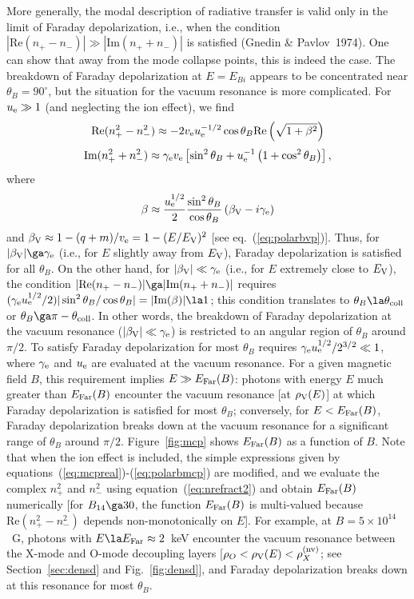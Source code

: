 \documentclass{mn2e}
\newcommand{\be}{\begin{equation}}
\newcommand{\ee}{\end{equation}}
\newcommand{\lp}{\left(}
\newcommand{\rp}{\right)}
\newcommand{\lb}{\left[}
\newcommand{\rb}{\right]}
\newcommand{\Ebi}{E_{Bi}}
\newcommand{\thetab}{\theta_B}
\newcommand{\polarb}{\beta}
\newcommand{\uel}{u_{\rm e}}
\newcommand{\vel}{v_{\rm e}}
\newcommand{\vpq}{q}
\newcommand{\vpm}{m}
\newcommand{\Evp}{E_{\rm V}}
\newcommand{\densvp}{\rho_{\rm V}}
\newcommand{\polarbvp}{\beta_{\rm V}}
\newcommand{\gamdampe}{\gamma_{\rm e}}
\newcommand{\Emcp}{E_{\rm Far}}
\newcommand{\thetamcp}{\theta_{\rm coll}}
\begin{document}
{More generally, the modal description of radiative transfer is
valid only in the limit of Faraday depolarization, i.e., when
the condition $|\mbox{Re}(n_+-n_-)|\gg|\mbox{Im}(n_++n_-)|$
is satisfied (Gnedin \& Pavlov~1974).  One can show that away from
the mode collapse points, this is indeed the case.  The breakdown
of Faraday depolarization at $E=\Ebi$ appears to be concentrated
near $\thetab=90^\circ$, but the situation for the vacuum resonance
is more complicated.  For $\uel\gg 1$ (and neglecting the ion effect),
we find
\be
\mbox{Re}(n_+^2-n_-^2) \approx -2\vel\uel^{-1/2}\cos\thetab
 \mbox{Re}\lp\sqrt{1+\polarb^2}\rp \label{eq:mcpreal}
\ee
\be
\mbox{Im}(n_+^2+n_-^2) \approx \gamdampe\vel\lb\sin^2\thetab
 + \uel^{-1}\lp 1+\cos^2\thetab\rp\rb, \label{eq:mcpimag}
\ee
where
\be
\polarb \approx \frac{\uel^{1/2}}{2}\frac{\sin^2\thetab}{\cos\thetab}
 \lp\polarbvp-i\gamdampe\rp \label{eq:polarbmcp}
\ee
and $\polarbvp\approx 1-(\vpq+\vpm)/\vel=1-(E/\Evp)^2$
[see eq.~(\ref{eq:polarbvp})].  Thus, for $|\polarbvp|\ga\gamdampe$
(i.e., for $E$ slightly away from $\Evp$),
Faraday depolarization is satisfied for all $\thetab$.
On the other hand, for $|\polarbvp|\ll\gamdampe$
(i.e., for $E$ extremely close to $\Evp$), the condition
$|\mbox{Re}(n_+-n_-)|\ga|\mbox{Im}(n_++n_-)|$ requires
$(\gamdampe\uel^{1/2}/2)|\sin^2\thetab/\cos\thetab|=|\mbox{Im}(\polarb)|\la 1$;
this condition translates to $\thetab\la\thetamcp$ or
$\thetab\ga\pi-\thetamcp$.
In other words, the breakdown of Faraday depolarization at
the vacuum resonance ($|\polarbvp|\ll\gamdampe$) is restricted
to an angular region of $\thetab$ around $\pi/2$.
To satisfy Faraday depolarization for most $\thetab$ requires
$\gamdampe\uel^{1/2}/2^{3/2}\ll 1$, where $\gamdampe$ and $\uel$ are
evaluated at the vacuum resonance.  For a given magnetic field $B$,
this requirement implies $E\gg\Emcp(B)$: photons with energy
$E$ much greater than $\Emcp(B)$ encounter the vacuum resonance
[at $\densvp(E)$] at which Faraday depolarization is satisfied
for most $\thetab$; conversely, for $E<\Emcp(B)$, Faraday depolarization
breaks down at the vacuum resonance for a significant range of $\thetab$
around $\pi/2$.  Figure~\ref{fig:mcp} shows $\Emcp(B)$ as a function of
$B$.  Note that when the ion effect is included, the simple expressions
given by equations~(\ref{eq:mcpreal})-(\ref{eq:polarbmcp}) are modified,
and we evaluate the complex $n_+^2$ and $n_-^2$ using
equation~(\ref{eq:nrefract2}) and obtain $\Emcp(B)$ numerically
[for $B_{14}\ga 30$, the function $\Emcp(B)$ is multi-valued
because $\mbox{Re}(n_+^2-n_-^2)$ depends non-monotonically on $E$].
For example, at $B=5\times 10^{14}$~G, photons with
$E\la\Emcp\approx 2$~keV encounter the vacuum resonance
between the X-mode and O-mode decoupling layers
[$\rho_O<\densvp(E)<\rho_X^{(\rm nv)}$; see Section~\ref{sec:densd}
and Fig.~\ref{fig:densd}],
and Faraday depolarization breaks down at this resonance for most
$\thetab$.

}
\end{document}
